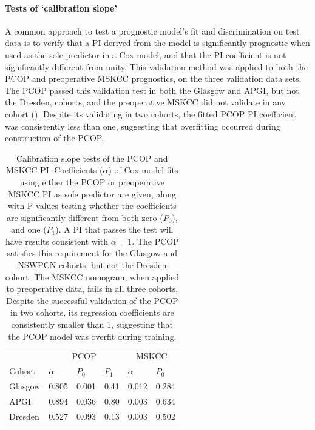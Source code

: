 \documentclass[dissertation.tex]{subfiles}
\begin{document}
\paragraph{Tests of `calibration slope'}
A common approach to test a prognostic model's fit and discrimination on test data is to verify that a \gls{PI} derived from the model is significantly prognostic when used as the sole predictor in a Cox model, and that the \gls{PI} coefficient is not significantly different from unity.  This validation method was applied to both the \gls{PCOP} and preoperative \gls{MSKCC} prognostics, on the three validation data sets.  The \gls{PCOP} passed this validation test in both the Glasgow and \gls{APGI}, but not the Dresden, cohorts, and the preoperative \gls{MSKCC} did not validate in any cohort ().  Despite its validating in two cohorts, the fitted \gls{PCOP} \gls{PI} coefficient was consistently less than one, suggesting that overfitting occurred during construction of the \gls{PCOP}.

\begin{table}[h]
\centering
\caption[Tests of \acrshort{PCOP} calibration slope]{Calibration slope tests of the \gls{PCOP} and \gls{MSKCC} \gls{PI}.  Coefficients ($\alpha$) of Cox model fits using either the \gls{PCOP} or preoperative \gls{MSKCC} \gls{PI} as sole predictor are given, along with P-values testing whether the coefficients are significantly different from both zero ($P_0$), and one ($P_1$).  A \gls{PI} that passes the test will have results consistent with $\alpha = 1$.  The \gls{PCOP} satisfies this requirement for the Glasgow and \gls{NSWPCN} cohorts, but not the Dresden cohort.  The \gls{MSKCC} nomogram, when applied to preoperative data, fails in all three cohorts.  Despite the successful validation of the \gls{PCOP} in two cohorts, its regression coefficients are consistently smaller than 1, suggesting that the \gls{PCOP} model was overfit during training.}\label{tab:nomo-val-slope}
\begin{tabular}{@{}llllll@{}}
\toprule
          & \multicolumn{3}{c}{PCOP}     & \multicolumn{2}{c}{MSKCC}  \\ \cmidrule(r){2-4} \cmidrule(r){5-6}
Cohort    & $\alpha$ & $P_0$   & $P_1$   & $\alpha$   & $P_0$         \\ \midrule
Glasgow   & 0.805    & 0.001   & 0.41    & 0.012      & 0.284         \\
APGI      & 0.894    & 0.036   & 0.80    & 0.003      & 0.634         \\
Dresden   & 0.527    & 0.093   & 0.13    & 0.003      & 0.502         \\ \bottomrule
\end{tabular}
\end{table}
\end{document}
